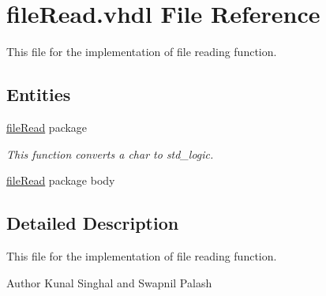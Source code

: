 \hypertarget{file_read_8vhdl}{\section{file\-Read.\-vhdl File Reference}
\label{file_read_8vhdl}
}


This file for the implementation of file reading function.  


\subsection*{Entities}
\begin{DoxyCompactItemize}
\item 
\hyperlink{classfile_read}{file\-Read} package
\begin{DoxyCompactList}\small\item\em This function converts a char to std\-\_\-logic. \end{DoxyCompactList}\item 
\hyperlink{class__file_read}{file\-Read} package body
\end{DoxyCompactItemize}


\subsection{Detailed Description}
This file for the implementation of file reading function. \begin{DoxyAuthor}{Author}
Kunal Singhal and Swapnil Palash 
\end{DoxyAuthor}
